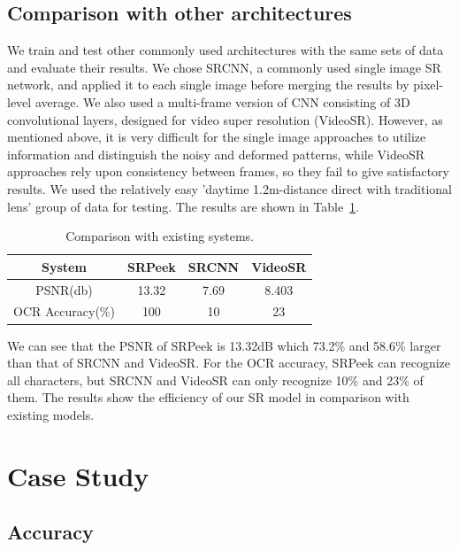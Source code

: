 \subsection{Comparison with other architectures}
We train and test other commonly used architectures with the same sets of data and evaluate their results. We chose SRCNN, a commonly used single image SR network, and applied it to each single image before merging the results by pixel-level average. We also used a multi-frame version of CNN consisting of 3D convolutional layers, designed for video super resolution (VideoSR). However, as mentioned above, it is very difficult for the single image approaches to utilize information and distinguish the noisy and deformed patterns, while VideoSR approaches rely upon consistency between frames, so they fail to give satisfactory results. We used the relatively easy 'daytime 1.2m-distance direct with traditional lens' group of data for testing. The results are shown in Table~\ref{table-comp}.
\begin{table}[!t]
    \centering
    \caption{Comparison with existing systems.}
    \begin{tabular}{@{}cccc@{}}
        \toprule
    System & SRPeek & SRCNN & VideoSR \\ \midrule
    PSNR(db) & 13.32 & 7.69 & 8.403\\ 
    OCR Accuracy(\%) & 100 & 10 & 23\\ \bottomrule
    \end{tabular}
    \label{table-comp}
\end{table}

We can see that the PSNR of SRPeek is 13.32dB which 73.2\% and 58.6\% larger than that of SRCNN and VideoSR. For the OCR accuracy, SRPeek can recognize all characters, but SRCNN and VideoSR can only recognize 10\% and 23\% of them. The results show the efficiency of our SR model in comparison with existing models.

\section{Case Study}
\label{case-study}
\subsection{Accuracy}

